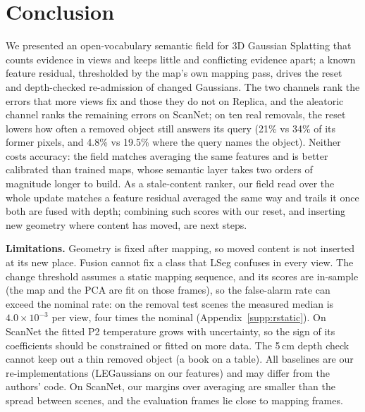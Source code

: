 \documentclass[journal]{IEEEtran}
\begin{document}
\section{Conclusion}
\label{sec:conclusion}
We presented an open-vocabulary semantic field for 3D Gaussian Splatting that counts evidence in views and keeps little and conflicting evidence apart; a known feature residual, thresholded by the map's own mapping pass, drives the reset and depth-checked re-admission of changed Gaussians. The two channels rank the errors that more views fix and those they do not on Replica, and the aleatoric channel ranks the remaining errors on ScanNet; on ten real removals, the reset lowers how often a removed object still answers its query (21\% vs 34\% of its former pixels, and 4.8\% vs 19.5\% where the query names the object). Neither costs accuracy: the field matches averaging the same features and is better calibrated than trained maps, whose semantic layer takes two orders of magnitude longer to build. As a stale-content ranker, our field read over the whole update matches a feature residual averaged the same way and trails it once both are fused with depth; combining such scores with our reset, and inserting new geometry where content has moved, are next steps.

\textbf{Limitations.} Geometry is fixed after mapping, so moved content is not inserted at its new place. Fusion cannot fix a class that LSeg confuses in every view. The change threshold assumes a static mapping sequence, and its scores are in-sample (the map and the PCA are fit on those frames), so the false-alarm rate can exceed the nominal rate: on the removal test scenes the measured median is $4.0\times10^{-3}$ per view, four times the nominal (Appendix~\ref{supp:rstatic}). On ScanNet the fitted P2 temperature grows with uncertainty, so the sign of its coefficients should be constrained or fitted on more data. The 5\,cm depth check cannot keep out a thin removed object (a book on a table). All baselines are our re-implementations (LEGaussians on our features) and may differ from the authors' code. On ScanNet, our margins over averaging are smaller than the spread between scenes, and the evaluation frames lie close to mapping frames.

\appendices
\end{document}
